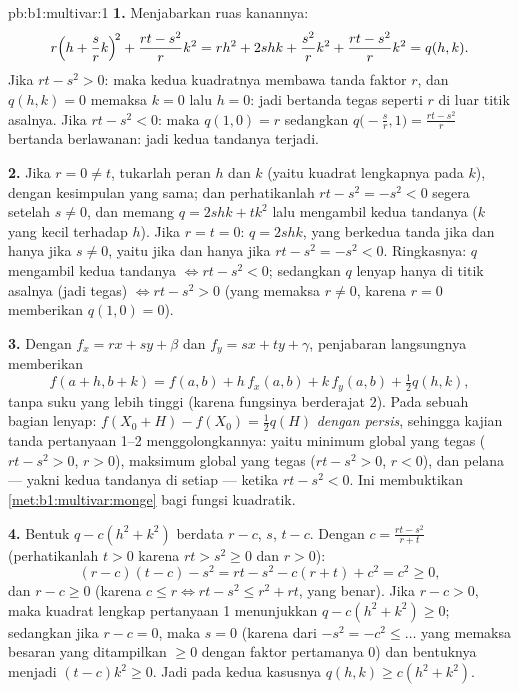 \begin{solution}{pb:b1:multivar:1}
\textbf{1.} Menjabarkan ruas kanannya:
\[
r\Bigl(h + \frac srk\Bigr)^{\!2} + \frac{rt - s^2}{r}k^2
= rh^2 + 2shk + \frac{s^2}{r}k^2 + \frac{rt - s^2}{r}k^2
= q(h,k) .
\]
Jika $rt - s^2 > 0$: maka kedua kuadratnya membawa tanda faktor $r$,
dan $q(h,k) = 0$ memaksa $k = 0$ lalu $h = 0$: jadi bertanda tegas seperti $r$
di luar titik asalnya. Jika $rt - s^2 < 0$: maka $q(1, 0) = r$ sedangkan
$q\bigl(-\frac sr, 1\bigr) = \frac{rt - s^2}{r}$ bertanda
berlawanan: jadi kedua tandanya terjadi.

\textbf{2.} Jika $r = 0 \neq t$, tukarlah peran $h$ dan $k$
(yaitu kuadrat lengkapnya pada $k$), dengan kesimpulan yang sama; dan perhatikanlah
$rt - s^2 = -s^2 < 0$ segera setelah $s \neq 0$, dan memang $q =
2shk + tk^2$ lalu mengambil kedua tandanya ($k$ yang kecil terhadap $h$). Jika
$r = t = 0$: $q = 2shk$, yang berkedua tanda jika dan hanya jika $s \neq 0$, yaitu jika dan hanya jika
$rt - s^2 = -s^2 < 0$. Ringkasnya: $q$ mengambil kedua tandanya $\iff rt -
s^2 < 0$; sedangkan $q$ lenyap hanya di titik asalnya (jadi tegas) $\iff rt -
s^2 > 0$ (yang memaksa $r \neq 0$, karena $r = 0$ memberikan $q(1,0) =
0$).

\textbf{3.} Dengan $f_x = rx + sy + \beta$ dan $f_y = sx + ty +
\gamma$, penjabaran langsungnya memberikan
\[
f(a + h, b + k) = f(a, b) + h\,f_x(a,b) + k\,f_y(a,b)
+ \tfrac12 q(h, k),
\]
tanpa suku yang lebih tinggi (karena fungsinya  berderajat
$2$). Pada sebuah  bagian  lenyap: $f(X_0 + H)
- f(X_0) = \frac12 q(H)$ \emph{dengan persis}, sehingga kajian tanda
pertanyaan 1--2 menggolongkannya: yaitu minimum global yang tegas ($rt - s^2 >
0$, $r > 0$), maksimum global yang tegas ($rt - s^2 > 0$, $r < 0$),
dan pelana --- yakni kedua tandanya di setiap  --- ketika $rt - s^2 <
0$. Ini membuktikan \cref{met:b1:multivar:monge} bagi fungsi
kuadratik.

\textbf{4.} Bentuk $q - c(h^2 + k^2)$ berdata $r - c$, $s$,
$t - c$. Dengan $c = \frac{rt - s^2}{r + t}$ (perhatikanlah $t > 0$ karena
$rt > s^2 \geq 0$ dan $r > 0$):
\[
(r - c)(t - c) - s^2 = rt - s^2 - c(r + t) + c^2 = c^2 \geq 0,
\]
dan $r - c \geq 0$ (karena $c \leq r \iff rt - s^2 \leq r^2 + rt$,
yang benar). Jika $r - c > 0$, maka kuadrat lengkap pertanyaan 1 menunjukkan
$q - c(h^2 + k^2) \geq 0$; sedangkan jika $r - c = 0$, maka $s = 0$ (karena dari
$-s^2 = -c^2 \leq \dots$ yang memaksa besaran yang ditampilkan
$\geq 0$ dengan faktor pertamanya $0$) dan bentuknya menjadi $(t - c)k^2 \geq
0$. Jadi pada kedua kasusnya $q(h,k) \geq c(h^2 + k^2)$.


\end{solution}
